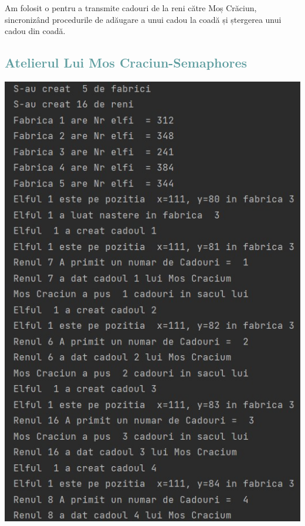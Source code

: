 \documentclass{article}
\begin{document}
Am folosit o pentru a transmite cadouri de la reni către Moș Crăciun, sincronizând procedurile de adăugare a unui cadou la coadă și ștergerea unui cadou din coadă.\\
\subsection{\textcolor{CadetBlue}{Atelierul Lui Mos Craciun-Semaphores}}
\begin{center}
    \textbf{\includegraphics[scale=0.8]{2.jpg}}
\end{center}
\end{document}
